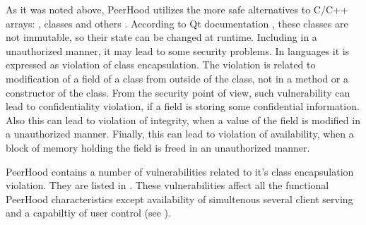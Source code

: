 %
As it was noted above, PeerHood utilizes the more safe alternatives to C/C++ arrays: ,  classes and others . 
%
According to Qt documentation , these classes are not immutable, so their state can be changed at runtime. 
%
Including in a unauthorized manner, it may lead to some security problems. 
%
In  languages it is expressed as violation of class encapsulation. 
%
The violation is related to modification of a field of a class from outside of the class, not in a method or a constructor of the class. 
%
From the security point of view, such vulnerability can lead to confidentiality violation, if a field is storing some confidential information. 
%
Also this can lead to violation of integrity, when a value of the field is modified in a unauthorized manner. 
%
Finally, this can lead to violation of availability, when a block of memory holding the field is freed in an unauthorized manner. 

%
PeerHood  contains a number of vulnerabilities related to it's class encapsulation violation. 
%
They are listed in . 
%
These vulnerabilities affect all the functional PeerHood characteristics except availability of simultenous several client serving and a capabiltiy of user control (see ). 

